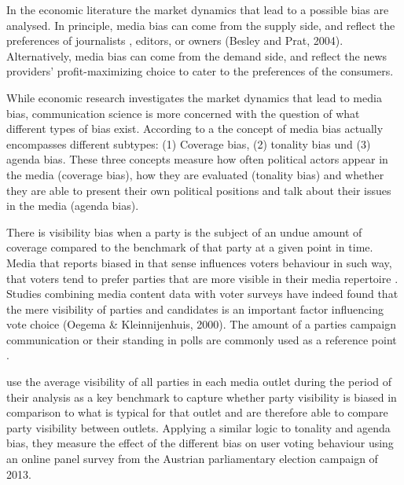 \documentclass[12pt,a4paper,notitlepage]{article}
\begin{document}
In the economic literature the market dynamics that lead to a possible bias are analysed. In principle, media bias can come from the supply side, and reflect the preferences of journalists \citep{baron_persistent_2006}, editors, or owners (Besley and Prat, 2004). Alternatively, media bias can come from the demand side, and reflect the news providers' profit-maximizing choice to cater to the preferences of the consumers. 


 While economic research investigates the market dynamics that lead to media bias, communication science is more concerned with the question of what different types of bias exist. According to a \citet{dalessio_media_2000} the concept of media bias actually encompasses different subtypes: (1) Coverage bias, (2) tonality bias und (3) agenda bias. These three concepts measure how often political actors appear in the media (coverage bias), how they are evaluated (tonality bias) and whether they are able to present their own political positions and talk about their issues in the media (agenda bias).
 
There is visibility bias when a party is the subject of an undue amount of coverage compared to the benchmark of that party at a given point in time. Media that reports biased in that sense influences voters behaviour in such way, that voters tend to prefer parties that are more visible in their media repertoire \citep{eberl_one_2017}. Studies combining media content data with voter surveys have indeed found that the mere visibility of parties and candidates is an important factor influencing vote choice (Oegema & Kleinnijenhuis, 2000). The amount of a parties campaign communication or their standing in polls are commonly used as a reference point \citep{junque_de_fortuny_media_2012, hopmann_political_2012}. 

\citet{eberl_one_2017} use the average visibility of all parties in each media outlet during the period of their analysis as a key benchmark to capture whether party visibility is biased in comparison to what is typical for that outlet and are therefore able to compare party visibility between outlets. Applying a similar logic to tonality and agenda bias, they measure the effect of the different bias on user voting behaviour using an online panel survey from the Austrian parliamentary election campaign of 2013. 


\end{document}
